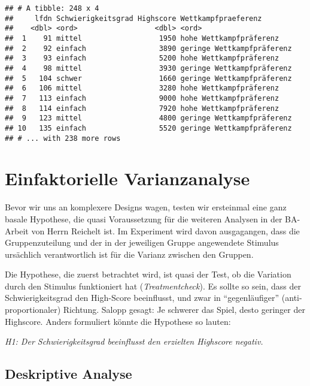 \documentclass[
]{book}
\begin{document}
\begin{verbatim}
## # A tibble: 248 x 4
##     lfdn Schwierigkeitsgrad Highscore Wettkampfpraeferenz       
##    <dbl> <ord>                  <dbl> <ord>                     
##  1    91 mittel                  1950 hohe Wettkampfpräferenz   
##  2    92 einfach                 3890 geringe Wettkampfpräferenz
##  3    93 einfach                 5200 hohe Wettkampfpräferenz   
##  4    98 mittel                  3930 geringe Wettkampfpräferenz
##  5   104 schwer                  1660 geringe Wettkampfpräferenz
##  6   106 mittel                  3280 hohe Wettkampfpräferenz   
##  7   113 einfach                 9000 hohe Wettkampfpräferenz   
##  8   114 einfach                 7920 hohe Wettkampfpräferenz   
##  9   123 mittel                  4800 geringe Wettkampfpräferenz
## 10   135 einfach                 5520 geringe Wettkampfpräferenz
## # ... with 238 more rows
\end{verbatim}

\hypertarget{einfaktorielle-varianzanalyse}{%
\section{Einfaktorielle Varianzanalyse}\label{einfaktorielle-varianzanalyse}}

Bevor wir uns an komplexere Designs wagen, testen wir ersteinmal eine ganz basale Hypothese, die quasi Voraussetzung für die weiteren Analysen in der BA-Arbeit von Herrn Reichelt ist. Im Experiment wird davon ausgagangen, dass die Gruppenzuteilung und der in der jeweiligen Gruppe angewendete Stimulus ursächlich verantwortlich ist für die Varianz zwischen den Gruppen.

Die Hypothese, die zuerst betrachtet wird, ist quasi der Test, ob die Variation durch den Stimulus funktioniert hat (\emph{Treatmentcheck}). Es sollte so sein, dass der Schwierigkeitsgrad den High-Score beeinflusst, und zwar in ``gegenläufiger'' (anti-proportionaler) Richtung. Salopp gesagt: Je schwerer das Spiel, desto geringer der Highscore. Anders formuliert könnte die Hypothese so lauten:

\emph{H1: Der Schwierigkeitsgrad beeinflusst den erzielten Highscore negativ.}

\hypertarget{deskriptive-analyse}{%
\subsection{Deskriptive Analyse}\label{deskriptive-analyse}}
\end{document}
